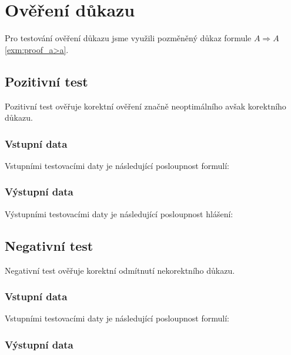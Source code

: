 \documentclass[thesis=B,czech,hidelinks]{thesis}[2012/06/26]
\begin{document}


\section{Ověření důkazu}

Pro testování ověření důkazu jsme využili pozměněný důkaz formule $A \Rightarrow A$ \ref{exm:proof_a>a}.

\subsection{Pozitivní test}

Pozitivní test ověřuje korektní ověření značně neoptimálního avšak korektního důkazu.

\subsubsection{Vstupní data}

Vstupními testovacími daty je následující posloupnost formulí:



\subsubsection{Výstupní data}

Výstupními testovacími daty je následující posloupnost hlášení:



\subsection{Negativní test}

Negativní test ověřuje korektní odmítnutí nekorektního důkazu.

\subsubsection{Vstupní data}

Vstupními testovacími daty je následující posloupnost formulí:



\subsubsection{Výstupní data}
\end{document}
